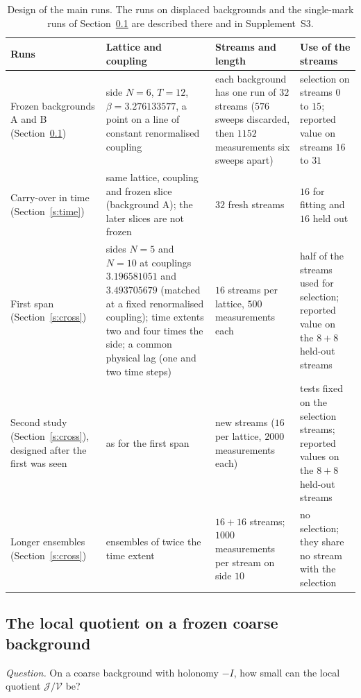 \begin{table}[t]
\centering\small
\begin{tabular}{@{}>{\raggedright\arraybackslash}p{}>{\raggedright\arraybackslash}p{}>{\raggedright\arraybackslash}p{}>{\raggedright\arraybackslash}p{}@{}}
\toprule
Runs & Lattice and coupling & Streams and length & Use of the streams \\
\midrule
Frozen backgrounds \textsf{A} and \textsf{B} (Section~\ref{s:local}) &
side $N=6$, $T=12$, $\beta=3.276133577$, a point on a line of constant renormalised coupling &
each background has one run of $32$ streams ($576$ sweeps discarded, then $1152$ measurements six sweeps apart) &
selection on streams $0$ to $15$; reported value on streams $16$ to $31$ \\
\addlinespace
Carry-over in time (Section~\ref{s:time}) &
same lattice, coupling and frozen slice (background \textsf{A}); the later slices are not frozen &
$32$ fresh streams &
$16$ for fitting and $16$ held out \\
\addlinespace
First span (Section~\ref{s:cross}) &
sides $N=5$ and $N=10$ at couplings $3.196581051$ and $3.493705679$ (matched at a fixed renormalised
coupling); time extents two and four times the side; a common physical lag (one and two time steps) &
$16$ streams per lattice, $500$ measurements each &
half of the streams used for selection; reported value on the $8+8$ held-out streams \\
\addlinespace
Second study (Section~\ref{s:cross}), designed after the first was seen &
as for the first span &
new streams ($16$ per lattice, $2000$ measurements each) &
tests fixed on the selection streams; reported values on the $8+8$ held-out streams \\
\addlinespace
Longer ensembles (Section~\ref{s:cross}) &
ensembles of twice the time extent &
$16+16$ streams; $1000$ measurements per stream on side $10$ &
no selection; they share no stream with the selection \\
\bottomrule
\end{tabular}
\caption{Design of the main runs. The runs on displaced backgrounds and the single-mark runs of
Section~\ref{s:local} are described there and in Supplement~S3.}\label{tab:runs}
\end{table}

\subsection{The local quotient on a frozen coarse background}\label{s:local}
\emph{Question.} On a coarse background with holonomy $-I$, how small can the local quotient
$\mathcal J/\mathcal V$ be?

